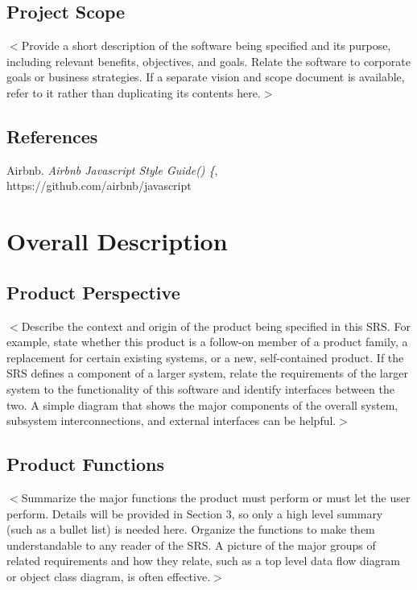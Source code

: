 \documentclass{scrreprt}
\begin{document}
\section{Project Scope}
$<$Provide a short description of the software being specified and its purpose,
including relevant benefits, objectives, and goals. Relate the software to
corporate goals or business strategies. If a separate vision and scope document
is available, refer to it rather than duplicating its contents here.$>$

\section{References}
Airbnb. \textit{Airbnb Javascript Style Guide() \{},\\ https://github.com/airbnb/javascript



\chapter{Overall Description}

\section{Product Perspective}
$<$Describe the context and origin of the product being specified in this SRS.
For example, state whether this product is a follow-on member of a product
family, a replacement for certain existing systems, or a new, self-contained
product. If the SRS defines a component of a larger system, relate the
requirements of the larger system to the functionality of this software and
identify interfaces between the two. A simple diagram that shows the major
components of the overall system, subsystem interconnections, and external
interfaces can be helpful.$>$

\section{Product Functions}
$<$Summarize the major functions the product must perform or must let the user
perform. Details will be provided in Section 3, so only a high level summary
(such as a bullet list) is needed here. Organize the functions to make them
understandable to any reader of the SRS. A picture of the major groups of
related requirements and how they relate, such as a top level data flow diagram
or object class diagram, is often effective.$>$
\end{document}

